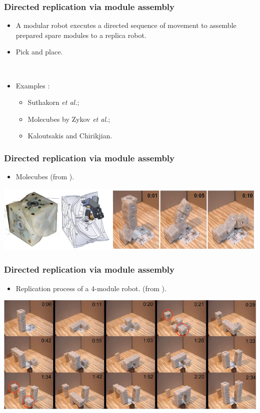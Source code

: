 \documentclass[14pt]{beamer}
\theoremstyle{remark}
\newcommand{\etal}{\textit{et al.}}
\begin{document}
\begin{frame}
  \frametitle{Directed replication via module assembly}
  \begin{itemize}
  	\item A modular robot executes a directed sequence of movement to assemble prepared spare modules to a replica robot.
  	\item Pick and place.
  	
  	\mbox{ }
  	
  	\item Examples :
  	\begin{itemize}
  	  \item Suthakorn \etal\cite{suthakorn_autonomous_2003};
  	  \item Molecubes by Zykov \etal \cite{zykov_self-reproducing_2005}\cite{zykov_evolved_2007};
  	  \item Kaloutsakis and Chirikjian\cite{kaloutsakis_stochastic_2011}.
  	\end{itemize}
	\end{itemize}
\end{frame}

\begin{frame}
  \frametitle{Directed replication via module assembly}
  \begin{itemize}
  	\item Molecubes (from \cite{zykov_self-reproducing_2005}).
	\end{itemize}
	\begin{center}
	  \includegraphics[width=.8\textwidth]{molecubes_a}
	\end{center}
\end{frame}

\begin{frame}
  \frametitle{Directed replication via module assembly}
  \begin{itemize}
  	\item Replication process of a 4-module robot. (from \cite{zykov_self-reproducing_2005}).
	\end{itemize}
	\begin{center}
	  \includegraphics[width=.8\textwidth]{molecubes_b}
	\end{center}
\end{frame}
\end{document}
